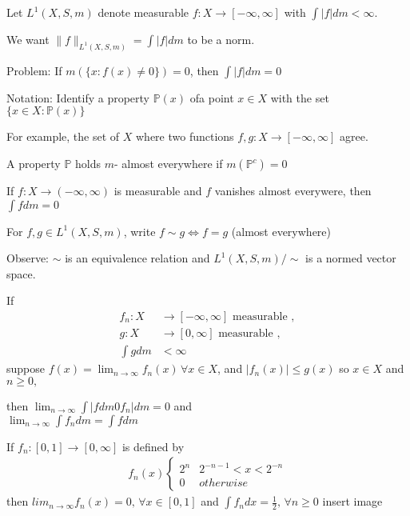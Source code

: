 Let $L^{1}(X,S, m)$ denote measurable $f: X \to [-\infty, \infty]$ with $\int | f| dm < \infty$.

We want $\|f\|_{L^{1}(X,S, m)} = \int |f| dm$ to be a norm.

Problem: If $m(\{x : f(x) \neq 0 \}) = 0$, then $\int |f| dm = 0$

\begin{remark}
	Notation: Identify a property $\mathbb{P}(x)$ ofa point $x \in X$ with the set $\{x \in X : \mathbb{P}(x)\}$
\end{remark}

For example, the set of $X$ where two functions  $f,g : X \to [-\infty, \infty]$ agree.

A property $\mathbb{P}$ holds $m$- almost everywhere if $m(\mathbb{P}^{c}) = 0$ 

\begin{example}
	If $f : X \to (-\infty, \infty)$ is measurable and $f$ vanishes almost everywere, then $\int f dm = 0$
\end{example}


For $f,g \in L^{1}(X,S, m)$, write $f \sim g \iff f=g$ (almost everywhere)

Observe: $\sim$ is an equivalence relation and $L^{1}(X,S, m) / \sim$ is a normed vector space.


\begin{definition}
	If
	\begin{align*}
		f_n : X &\to [-\infty, \infty] \text{ measurable }, \\
		g : X &\to [0, \infty] \text{ measurable }, \\
		\int g dm &< \infty
	\end{align*}
	suppose $f(x) = \lim_{n \to \infty} f_n(x)\, \forall x \in X$, and $|f_n (x) | \leq g(x)$ so
	$x \in X$ and $n \geq 0,$

	then  $\lim_{n\to \infty} \int | f dm 0 f_n | dm = 0$ and \\
	$\lim_{n\to \infty} \int f_n dm = \int f dm$

\end{definition}

\begin{example}
	If $f_n : [0,1] \to [0, \infty]$ is defined by
	\begin{align*}
		f_n (x) 
		\begin{cases}
			2^n & 2^{-n-1} < x < 2^{-n} \\
			0 & otherwise
		\end{cases}
	\end{align*} 
	then $lim_{n \to \infty} f_n (x) = 0, \, \forall x \in [0,1]$ and  $\int f_{n} dx = \frac{1}{2} ,\, \forall n \geq 0$
	insert image
\end{example}

